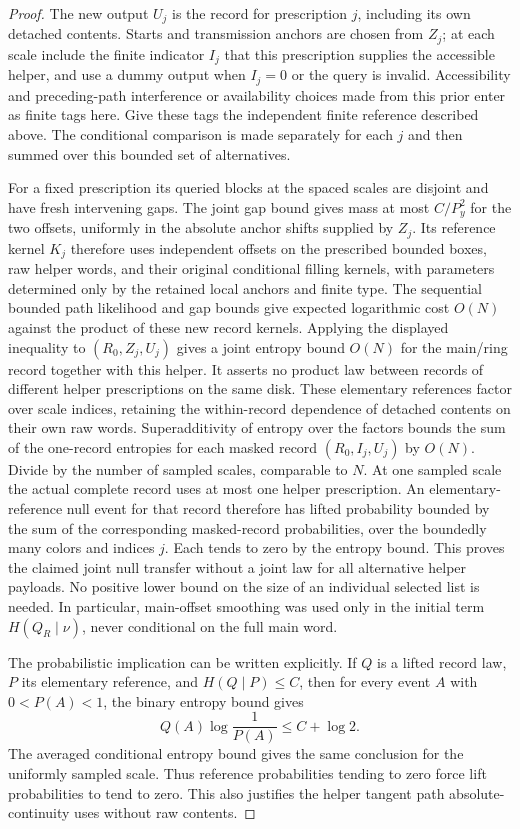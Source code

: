 \begin{proof}
The new output $U_j$ is the record for prescription $j$, including its own
detached contents. Starts and transmission anchors are chosen from $Z_j$;
at each scale include the finite indicator $I_j$ that this prescription
supplies the accessible helper, and use a dummy output when $I_j=0$ or
the query is invalid. Accessibility and preceding-path interference or
availability choices made from this prior enter as finite tags here. Give these tags the independent
finite reference described above. The conditional comparison is made separately
for each $j$ and then summed over this bounded set of alternatives.

For a fixed prescription its queried blocks at the spaced scales are
disjoint and have fresh intervening gaps. The joint gap bound gives mass at
most $C/P_y^2$ for the two offsets, uniformly in the absolute anchor shifts
supplied by $Z_j$. Its reference kernel $K_j$ therefore uses independent
offsets on the prescribed bounded boxes, raw helper words, and their original
conditional filling kernels, with parameters determined only by the retained
local anchors and finite type. The sequential bounded path likelihood and
gap bounds give expected logarithmic cost $O(N)$ against the product of these
new record kernels. Applying the displayed inequality to $(R_0,Z_j,U_j)$
gives a joint entropy bound $O(N)$ for the main/ring record together with
this helper. It asserts no product law between records of different helper
prescriptions on the same disk.
These elementary references factor over scale indices, retaining the
within-record dependence of detached contents on their own raw words.
Superadditivity of entropy over the factors bounds the sum of the
one-record entropies for each masked record $(R_0,I_j,U_j)$ by $O(N)$.
Divide by the number of sampled scales, comparable to $N$. At one sampled
scale the actual complete record uses at most one helper prescription.
An elementary-reference null event for that record therefore has lifted
probability bounded by the sum of the corresponding masked-record
probabilities, over the boundedly many colors and indices $j$. Each tends
to zero by the entropy bound. This proves the claimed joint null transfer
without a joint law for all alternative helper payloads. No positive lower
bound on the size of an individual selected list is needed. In
particular, main-offset smoothing was used only in the initial term
$H(Q_R\mid\nu)$, never conditional on the full main word.


The probabilistic implication can be written explicitly. If \(Q\) is a
lifted record law, \(P\) its elementary reference, and \(H(Q\mid P)\le C\),
then for every event \(A\) with \(0<P(A)<1\), the binary entropy bound gives
\[
 Q(A)\log\frac1{P(A)}\le C+\log2.
\]
The averaged conditional entropy bound gives the same conclusion for the
uniformly sampled scale. Thus reference probabilities tending to zero force
lift probabilities to tend to zero. This also justifies the helper tangent
path absolute-continuity uses without raw contents.\qedhere

\end{proof}

